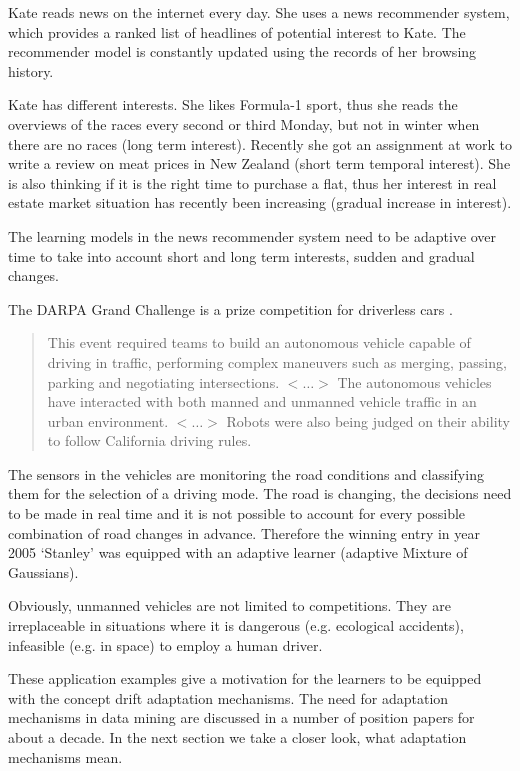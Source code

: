 \begin{example}
\label{exa:Kate}
Kate reads news on the internet every day.
She uses a news recommender system, which provides a ranked list of headlines of potential interest to Kate.
The recommender model is constantly updated using the records of her browsing history.

Kate has different interests.
She likes Formula-1 sport, thus she reads the overviews of the races every second or third Monday, but not in winter when there are no races (long term interest).
Recently she got an assignment at work to write a review on meat prices in New Zealand (short term temporal interest).
She is also thinking if it is the right time to purchase a flat, thus her interest in real estate market situation has recently been increasing (gradual increase in interest).

The learning models in the news recommender system need to be adaptive over time to take into account short and long term interests, sudden and gradual changes.
\end{example}

\begin{example} [Navigation]
\label{exa:darpa}
The DARPA Grand Challenge is a prize competition for driverless cars \cite{DARPA}. %
\begin{quotation}
This event required teams to build an autonomous vehicle capable of driving in traffic, performing complex maneuvers such as merging, passing, parking and negotiating intersections.  $<\ldots>$ The autonomous vehicles have interacted with both manned and unmanned vehicle traffic in an urban environment. $<\ldots>$  Robots were also being judged on their ability to follow California driving rules.
\end{quotation}
The sensors in the vehicles are monitoring the road conditions and classifying them for the selection of a driving mode. The road is changing, the decisions need to be made in real time and it is not possible to account for every possible combination of road changes in advance. Therefore the winning entry in year 2005  `Stanley' \cite{Thrun06} was equipped with an adaptive learner (adaptive Mixture of Gaussians).

Obviously, unmanned vehicles are not limited to competitions. They are irreplaceable in situations where it is dangerous (e.g. ecological accidents), infeasible (e.g. in space) to employ a human driver.
\end{example}


These application examples give a motivation for the learners to be equipped with the concept drift adaptation mechanisms. The need for adaptation mechanisms in data mining are discussed in a number of position papers \cite{Kelly99,Webb01,Dong03,Hand06,Kriegel07,Han09} for about a decade. In the next section we take a closer look, what adaptation mechanisms mean.
